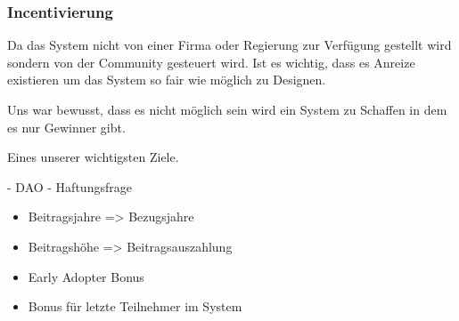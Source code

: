 \subsubsection{Incentivierung}

Da das System nicht von einer Firma oder Regierung zur Verfügung gestellt wird sondern von der Community gesteuert wird. Ist es wichtig, dass es Anreize existieren um das System so fair wie möglich zu Designen.

Uns war bewusst, dass es nicht möglich sein wird ein System zu Schaffen in dem es nur Gewinner gibt.

Eines unserer wichtigsten Ziele.

- DAO
- Haftungsfrage

\begin{itemize}
\item Beitragsjahre => Bezugsjahre
\item Beitragshöhe => Beitragsauszahlung
\item Early Adopter Bonus
\item Bonus für letzte Teilnehmer im System
\end{itemize}
